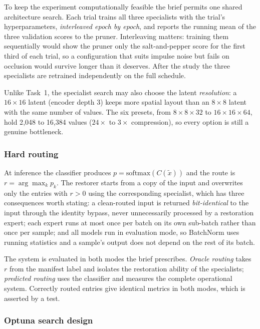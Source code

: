 \documentclass[conference]{IEEEtran}
\begin{document}
To keep the experiment computationally feasible the brief permits one shared
architecture search. Each trial trains all three specialists with the trial's
hyperparameters, \emph{interleaved epoch by epoch}, and reports the running mean
of the three validation scores to the pruner. Interleaving matters: training them
sequentially would show the pruner only the salt-and-pepper score for the first
third of each trial, so a configuration that suits impulse noise but fails on
occlusion would survive longer than it deserves. After the study the three
specialists are retrained independently on the full schedule.

Unlike Task~1, the specialist search may also choose the latent \emph{resolution}:
a $16\times16$ latent (encoder depth 3) keeps more spatial layout than an $8\times8$
latent with the same number of values. The six presets, from $8\times8\times32$ to
$16\times16\times64$, hold 2{,}048 to 16{,}384 values ($24\times$ to $3\times$
compression), so every option is still a genuine bottleneck.

\subsubsection{Hard routing}

At inference the classifier produces $p = \mathrm{softmax}(C(\tilde{x}))$ and the
route is $r = \arg\max_k p_k$. The restorer starts from a copy of the input and
overwrites only the entries with $r > 0$ using the corresponding specialist,
which has three consequences worth stating: a clean-routed input is returned
\emph{bit-identical} to the input through the identity bypass, never
unnecessarily processed by a restoration expert; each expert runs at most once
per batch on its own sub-batch rather than once per sample; and all models run in
evaluation mode, so BatchNorm uses running statistics and a sample's output does
not depend on the rest of its batch.

The system is evaluated in both modes the brief prescribes. \emph{Oracle
routing} takes $r$ from the manifest label and isolates the restoration ability
of the specialists; \emph{predicted routing} uses the classifier and measures the
complete operational system. Correctly routed entries give identical metrics in
both modes, which is asserted by a test.

\subsubsection{Optuna search design}
\end{document}

